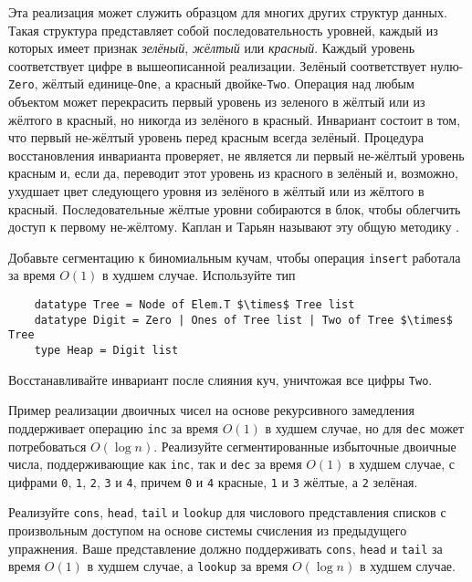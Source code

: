 \begin{frame}[fragile]{}

Эта реализация может служить образцом для многих других структур
данных. Такая структура представляет собой последовательность уровней,
каждый из которых имеет признак \emph{зелёный}, \emph{жёлтый} или
\emph{красный}. Каждый уровень
соответствует цифре в вышеописанной реализации. Зелёный соответствует
нулю-\lstinline!Zero!, жёлтый единице-\lstinline!One!, а красный
двойке-\lstinline!Two!. Операция над любым объектом может перекрасить
первый уровень из зеленого в жёлтый или из жёлтого в красный, но
никогда из зелёного в красный. Инвариант состоит в том, что первый
не-жёлтый уровень перед красным всегда зелёный. Процедура
восстановления инварианта проверяет, не является ли первый не-жёлтый
уровень красным и, если да, переводит этот уровень из красного в
зелёный и, возможно, ухудшает цвет следующего уровня из зелёного в
жёлтый или из жёлтого в красный. Последовательные жёлтые уровни
собираются в блок, чтобы облегчить доступ к первому не-жёлтому. Каплан
и Тарьян \cite{KaplanTarjan1995} называют эту общую методику
.

\begin{exercise}\label{ex:9.11}
  Добавьте сегментацию к биномиальным кучам, чтобы операция
  \lstinline!insert! работала за время $O(1)$ в худшем
  случае. Используйте тип
  \begin{lstlisting}
    datatype Tree = Node of Elem.T $\times$ Tree list
    datatype Digit = Zero | Ones of Tree list | Two of Tree $\times$ Tree
    type Heap = Digit list
  \end{lstlisting}
  Восстанавливайте инвариант после слияния куч, уничтожая все цифры \lstinline!Two!.
\end{exercise}

\begin{exercise}\label{ex:9.12}
  Пример реализации двоичных чисел на основе рекурсивного замедления
  поддерживает операцию \lstinline!inc! за время $O(1)$ в худшем
  случае, но для \lstinline!dec! может потребоваться $O(\log
  n)$. Реализуйте сегментированные избыточные двоичные числа,
  поддерживающие как \lstinline!inc!, так и \lstinline!dec! за время
  $O(1)$ в худшем случае, с цифрами \texttt{0}, \texttt{1},
  \texttt{2}, \texttt{3} и \texttt{4}, причем \texttt{0} и \texttt{4}
  красные, \texttt{1} и \texttt{3} жёлтые, а \texttt{2} зелёная.
\end{exercise}

\begin{exercise}\label{ex:9.13}
  Реализуйте \lstinline!cons!, \lstinline!head!, \lstinline!tail! и
  \lstinline!lookup! для числового представления списков с
  произвольным доступом на основе системы счисления из предыдущего
  упражнения. Ваше представление должно поддерживать \lstinline!cons!,
  \lstinline!head! и \lstinline!tail! за время $O(1)$ в худшем случае,
  а \lstinline!lookup! за время $O(\log n)$ в худшем случае.
\end{exercise}

\end{frame}

